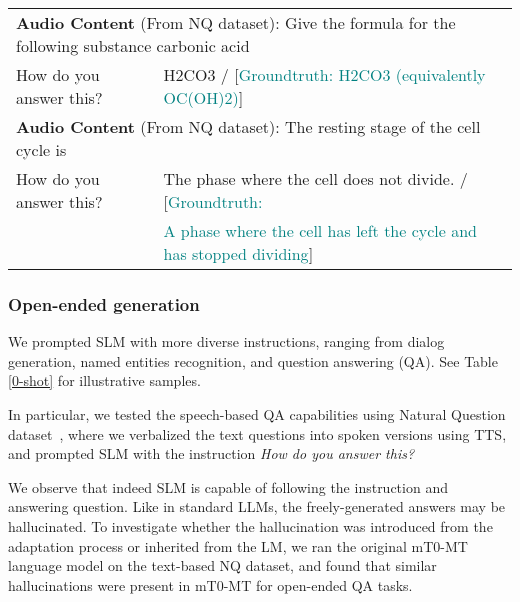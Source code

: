 \begin{table*}[h]
\begin{tabular}{ll}
\midrule
\midrule

\multicolumn{2}{l}{\textbf{Audio Content} (From NQ dataset): Give the formula for the following substance carbonic acid} \\
\hdashline

\hdashline

\rowcolor{white}

How do you answer this?  & H2CO3 / [\textcolor{teal}{Groundtruth: H2CO3 (equivalently OC(OH)2)}] \\

\midrule
\multicolumn{2}{l}{\textbf{Audio Content} (From NQ dataset): The resting stage of the cell cycle is} \\
\hdashline

\hdashline
\rowcolor{white}

How do you answer this?  & The phase where the cell does not divide. / [\textcolor{teal}{Groundtruth:}\\

& \textcolor{teal}{A phase where the cell has left the cycle and has stopped dividing}] \\

\bottomrule
\end{tabular}
\caption{\textbf{Zero-shot instruction following examples.} Given the same speech inputs, SLM can respond differently according to instructions. Particularly, we show predicted answers on audio Natural Question corpus. SLM is able to follow the instruction to answer the spoken question.}
\label{0-shot}
\vspace{-.1in}
\end{table*}


\subsubsection{Open-ended generation}

We prompted SLM with more diverse instructions, ranging from dialog generation, named entities recognition, and question answering (QA). See Table \ref{0-shot} for illustrative samples.

In particular, we tested the speech-based QA capabilities using Natural Question dataset~\cite{kwiatkowski2019natural}, where we verbalized the text questions into spoken versions using TTS, and prompted SLM with the instruction {\em How do you answer this?}

We observe that indeed SLM is capable of following the instruction and answering question. Like in standard LLMs, the freely-generated answers may be hallucinated. To investigate whether the hallucination was introduced from the adaptation process or inherited from the LM, we ran the original mT0-MT language model on the text-based NQ dataset, and found that similar hallucinations were present in mT0-MT for open-ended QA tasks.

\label{sec:open-ended}
